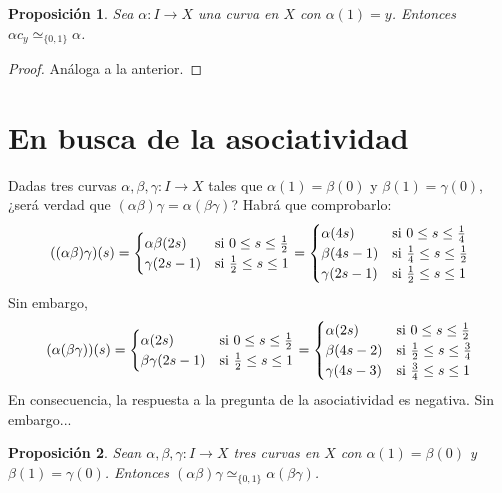 \documentclass[11pt]{report}
\newenvironment{cproposition} %
  {\begin{mdframed}[innertopmargin = 0pt,
                    innerbottommargin = 7.5pt,
                    backgroundcolor = lightgray!10,
                    linewidth = 1pt,
                    shadow = true,
                    shadowsize = 5pt,
                    roundcorner = 0pt,
                    skipabove = 0pt]
    \begin{proposition}}
  {\end{proposition}\end{mdframed}}
\newtheorem{proposition}{Proposición}[chapter]
\theoremstyle{definition}
\theoremstyle{definition}
\theoremstyle{remark}
\begin{document}
\begin{proposition}
\label{prop2.3.}
Sea $\alpha \colon I \to X$ una curva en $X$ con $\alpha(1) = y$. Entonces $\alpha c_y \simeq_{\{0,1\}} \alpha$.
\end{proposition}

\begin{proof}
Análoga a la anterior.
\end{proof}

\section{En busca de la asociatividad}

Dadas tres curvas $\alpha, \beta, \gamma \colon I \to X$ tales que $\alpha(1) = \beta(0)$ y $\beta(1) = \gamma(0)$, ¿será verdad que $(\alpha\beta)\gamma = \alpha(\beta\gamma)$? Habrá que comprobarlo:
\[((\alpha\beta)\gamma)(s) = \begin{cases}
    \alpha\beta(2s) & $si$ \ 0 \leq s \leq \frac{1}{2} \\
    \gamma(2s-1) & $si$ \ \frac{1}{2} \leq s \leq 1
\end{cases} = \begin{cases}
    \alpha(4s) & $si$ \ 0 \leq s \leq \frac{1}{4} \\
    \beta(4s-1) & $si$ \ \frac{1}{4} \leq s \leq \frac{1}{2} \\
    \gamma(2s-1) & $si$ \ \frac{1}{2} \leq s \leq 1
\end{cases}\]
Sin embargo,
\[(\alpha(\beta\gamma))(s) = \begin{cases}
    \alpha(2s) & $si$ \ 0 \leq s \leq \frac{1}{2} \\
    \beta\gamma(2s-1) & $si$ \ \frac{1}{2} \leq s \leq 1
\end{cases} = \begin{cases}
    \alpha(2s) & $si$ \ 0 \leq s \leq \frac{1}{2} \\
    \beta(4s-2) & $si$ \ \frac{1}{2} \leq s \leq \frac{3}{4} \\
    \gamma(4s-3) & $si$ \ \frac{3}{4} \leq s \leq 1
\end{cases}\]
En consecuencia, la respuesta a la pregunta de la asociatividad es negativa. Sin embargo...

\hfill

\begin{cproposition}
\label{prop2.4.}
Sean $\alpha,\beta,\gamma \colon I \to X$ tres curvas en $X$ con $\alpha(1) = \beta(0)$ y $\beta(1) = \gamma(0)$. Entonces $(\alpha\beta)\gamma \simeq_{\{0,1\}} \alpha(\beta\gamma)$.
\end{cproposition}
\end{document}
